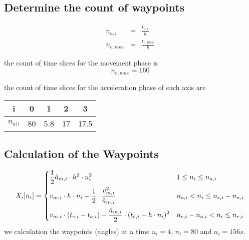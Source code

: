 \documentclass[professionalfonts, 
               xcolor={ usenames, %
                        dvipsnames,%
                        svgnames,%
                        table,%
                        hyperref%
                      }
              ]{beamer}
\begin{document}
\subsection{Determine the count of waypoints}
\begin{frame}
\begin{eqnarray}
n_{a,i} & = & \frac{t_{a,i}}{h} \\
n_{e,max} & = & \frac{t_{e,max}}{h}
\end{eqnarray}

the count of time slices for the movement phase is 
\begin{equation*}
n_{e,max} = 160
\end{equation*}

the count of time slices for the acceleration phase of each axis are
\begin{center}
\begin{tabular}{ccccc}
\toprule
i & 0 & 1 & 2 & 3 \\
\midrule
$n_{a|i}$ & 80 & 5.8 & 17 & 17.5 \\
\bottomrule
\end{tabular}
\end{center}
\end{frame}

\subsection{Calculation of the Waypoints}
\begin{frame}
\begin{equation*}
X_{i}[n_{i}] = 
\begin{dcases}
\frac{1}{2} \hat{a}_{m,i} \cdot h^2 \cdot n_{i}^2 & 1 \leq n_{i} \leq n_{a,i} \\ 
v_{m,i} \cdot h \cdot n_{i} - \frac{1}{2} \cdot \frac{v_{m,i}^2}{\hat{a}_{m,i}} & n_{a,i} < n_{i} \leq n_{e,i} - n_{a,i} \\
v_{m,i} \cdot (t_{e,i} - t_{a,i}) - \frac{\hat{a}_{m,i}}{2} \cdot (t_{e,i} - h \cdot n_{i})^2   & n_{e,i} - n_{a,i} < n_{i} \leq n_{e,i}
\end{dcases}
\end{equation*}
we calculation the waypoints (angles) at a time $n_i = 4$, $n_i = 80$ and $n_i = 156s$.
\end{frame}
\end{document}
